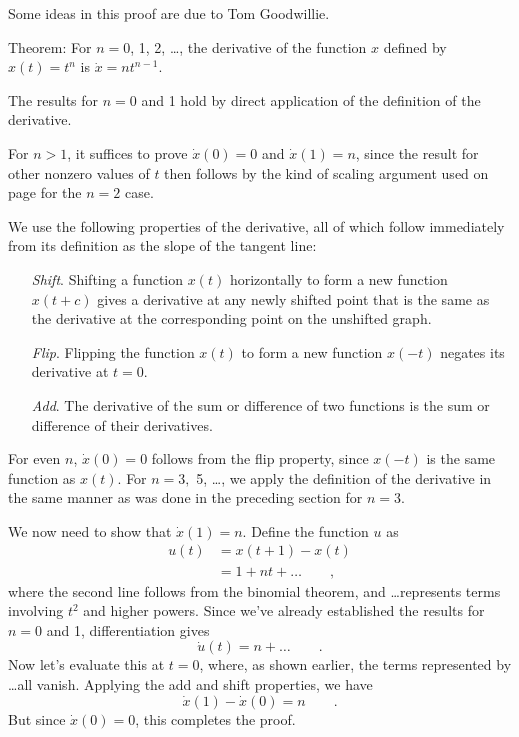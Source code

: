 \pagebreak


Some ideas in this proof are due to Tom Goodwillie.

Theorem: For $n=0$, 1, 2, \ldots, the derivative of the function $x$ defined by
$x(t)=t^n$ is $\dot{x}=nt^{n-1}$.

The results for $n=0$ and 1 hold by direct application of the definition of the derivative.

For $n>1$, it suffices to
prove $\dot{x}(0)=0$ and $\dot{x}(1)=n$, since the result for other
nonzero values of $t$ then follows by the kind of scaling argument
used on page \pageref{scaling} for the $n=2$ case.

We use the following properties of the derivative, all of which follow immediately from its
definition as the slope of the tangent line:

\begin{itemize}
\item[\emph{Shift}.] Shifting a function $x(t)$ horizontally to form a new function $x(t+c)$ gives a derivative
         at any newly shifted point that is the same as the derivative at the corresponding point on the unshifted graph.
\item[\emph{Flip}.] Flipping the function $x(t)$ to form a new function $x(-t)$ negates
         its derivative at $t=0$.
\item[\emph{Add}.] The derivative of the sum or difference of two functions is the sum or difference of their derivatives.
\end{itemize}

For even $n$, $\dot{x}(0)=0$ follows from the flip property, since $x(-t)$ is the same function as $x(t)$.
For $n=3,$ 5, \ldots, we apply the definition of the derivative in the same manner as was done in the preceding
section for $n=3$.

We now need to show that $\dot{x}(1)=n$. Define the function $u$ as
\begin{align*}
  u(t) &= x(t+1)-x(t) \\
       &= 1+nt + \ldots \qquad ,
\end{align*}
where the second line follows from the binomial theorem, and \ldots represents terms involving $t^2$ and
higher powers. Since we've already established the results for $n=0$ and 1,
differentiation gives
\begin{equation*}
  \dot{u}(t) = n + \ldots \qquad .
\end{equation*}
Now let's evaluate this at $t=0$, where, as shown earlier, the terms represented by \ldots all vanish.
Applying the add and shift properties, we have
\begin{equation*}
  \dot{x}(1)-\dot{x}(0) = n  \qquad .
\end{equation*}
But since $\dot{x}(0)=0$, this completes the proof.

